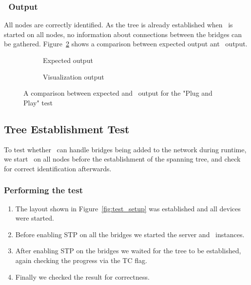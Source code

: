 \subsubsection*{\tool\ Output}
All nodes are correctly identified.
As the tree is already established when \tool\ is started on all nodes, no information about connections between the bridges can be gathered.
Figure~\ref{fig:pnp} shows a comparison between expected output ant \tool\ output.
\begin{figure}[h]
    \begin{subfigure}[b]{\textwidth}
        \centering
        \caption{Expected output}
        \label{fig:pnpExp}
    \end{subfigure}
    
    \vspace{0.5cm}

    \begin{subfigure}[b]{\textwidth}
        \centering
        
        \caption{Visualization output}
    \end{subfigure}
    \caption{A comparison between expected and \tool\ output for the "Plug and Play" test}
    \label{fig:pnp}
\end{figure}

\subsection*{Tree Establishment Test}
\label{tree_est_test}
To test whether \tool\ can handle bridges being added to the network during runtime, we start \tool\ on all nodes before the establishment of the spanning tree, and check for correct identification afterwards.

\subsubsection*{Performing the test}
\begin{enumerate}
    \item The layout shown in Figure~\ref{fig:test_setup} was established and all devices were started.
    \item Before enabling STP on all the bridges we started the server and \tool\ instances.
    \item After enabling STP on the bridges we waited for the tree to be established, again checking the progress via the TC flag.
    \item Finally we checked the result for correctness.
\end{enumerate}


